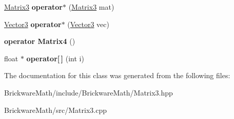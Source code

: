 \begin{DoxyCompactItemize}
\item 
\hypertarget{classBrickware_1_1Math_1_1Matrix3_ab36a010bc81351a9f1caa246d4afd94b}{}\hyperlink{classBrickware_1_1Math_1_1Matrix3}{Matrix3} {\bfseries operator$\ast$} (\hyperlink{classBrickware_1_1Math_1_1Matrix3}{Matrix3} mat)\label{classBrickware_1_1Math_1_1Matrix3_ab36a010bc81351a9f1caa246d4afd94b}

\item 
\hypertarget{classBrickware_1_1Math_1_1Matrix3_ad9ae4fe3dc920b9cfe27372468c813e2}{}\hyperlink{classBrickware_1_1Math_1_1Vector3}{Vector3} {\bfseries operator$\ast$} (\hyperlink{classBrickware_1_1Math_1_1Vector3}{Vector3} vec)\label{classBrickware_1_1Math_1_1Matrix3_ad9ae4fe3dc920b9cfe27372468c813e2}

\item 
\hypertarget{classBrickware_1_1Math_1_1Matrix3_ac095146db07b5095482252793a032496}{}{\bfseries operator Matrix4} ()\label{classBrickware_1_1Math_1_1Matrix3_ac095146db07b5095482252793a032496}

\item 
\hypertarget{classBrickware_1_1Math_1_1Matrix3_a908ac587fc8797cc7b265941a5abdddc}{}float $\ast$ {\bfseries operator\mbox{[}$\,$\mbox{]}} (int i)\label{classBrickware_1_1Math_1_1Matrix3_a908ac587fc8797cc7b265941a5abdddc}

\end{DoxyCompactItemize}


The documentation for this class was generated from the following files\+:\begin{DoxyCompactItemize}
\item 
Brickware\+Math/include/\+Brickware\+Math/Matrix3.\+hpp\item 
Brickware\+Math/src/Matrix3.\+cpp\end{DoxyCompactItemize}
